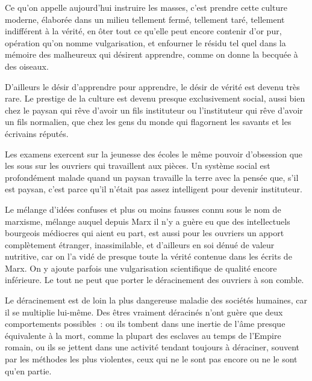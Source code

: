 \documentclass[french,twoside]{book} %
\begin{document}
Ce qu'on appelle aujourd'hui instruire les masses, c'est prendre cette culture moderne, élaborée dans un milieu tellement fermé, tellement taré, tellement indifférent à la vérité, en ôter tout ce qu'elle peut encore contenir d'or pur, opération qu'on nomme vulgarisation, et enfourner le résidu tel quel dans la mémoire des malheureux qui désirent apprendre, comme on donne la becquée à des oiseaux.\par
D'ailleurs le désir d'apprendre pour apprendre, le désir de vérité est devenu très rare. Le prestige de la culture est devenu presque exclusivement social, aussi bien chez le paysan qui rêve d'avoir un fils instituteur ou l'instituteur qui rêve d'avoir un fils normalien, que chez les gens du monde qui flagornent les savants et les écrivains réputés.\par
Les examens exercent sur la jeunesse des écoles le même pouvoir d'obsession que les sous sur les ouvriers qui travaillent aux pièces. Un système social est profondément malade quand un paysan travaille la terre avec la pensée que, s'il est paysan, c'est parce qu'il n'était pas assez intelligent pour devenir instituteur.\par
Le mélange d'idées confuses et plus ou moins fausses connu sous le nom de marxisme, mélange auquel depuis Marx il n'y a guère eu que des intellectuels bourgeois médiocres qui aient eu part, est aussi pour les ouvriers un apport complètement étranger, inassimilable, et d'ailleurs en soi dénué de valeur nutritive, car on l'a vidé de presque toute la vérité contenue dans les écrits de Marx. On y ajoute parfois une vulgarisation scientifique de qualité encore inférieure. Le tout ne peut que porter le déracinement des ouvriers à son comble.\par
Le déracinement est de loin la plus dangereuse maladie des sociétés humaines, car il se multiplie lui-même. Des êtres vraiment déracinés n'ont guère que deux comportements possibles : ou ils tombent dans une inertie de l'âme presque équivalente à la mort, comme la plupart des esclaves au temps de l'Empire romain, ou ils se jettent dans une activité tendant toujours à déraciner, souvent par les méthodes les plus violentes, ceux qui ne le sont pas encore ou ne le sont qu'en partie.\par
\end{document}
